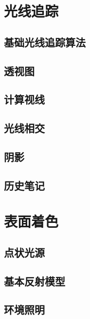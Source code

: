 \documentclass[lang=cn,12pt]{elegantbook}
\begin{document}
\chapter{光线追踪}

\section{基础光线追踪算法}

\section{透视图}

\section{计算视线}

\section{光线相交}

\section{阴影}

\section{历史笔记}

\chapter{表面着色}

\section{点状光源}


\section{基本反射模型}


\section{环境照明}
\end{document}
